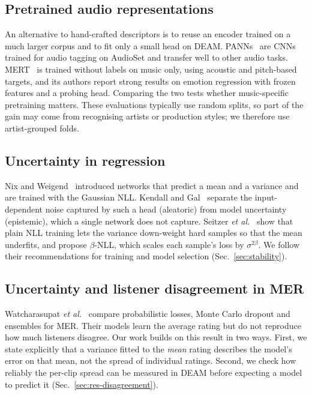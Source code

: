 \documentclass[conference]{IEEEtran}
\begin{document}
\subsection{Pretrained audio representations}
An alternative to hand-crafted descriptors is to reuse an encoder trained on a
much larger corpus and to fit only a small head on DEAM. PANNs~\cite{kong2020}
are CNNs trained for audio tagging on AudioSet and transfer well to other
audio tasks. MERT~\cite{li2024mert} is trained without labels on music only,
using acoustic and pitch-based targets, and its authors report strong results
on emotion regression with frozen features and a probing head. Comparing the
two tests whether music-specific pretraining matters. These evaluations
typically use random splits, so part of the gain may come from recognising
artists or production styles; we therefore use artist-grouped folds.

\subsection{Uncertainty in regression}
Nix and Weigend~\cite{nix1994} introduced networks that predict a mean and a
variance and are trained with the Gaussian NLL. Kendall and
Gal~\cite{kendall2017} separate the input-dependent noise captured by such a
head (aleatoric) from model uncertainty (epistemic), which a single network
does not capture. Seitzer \emph{et al.}~\cite{seitzer2022} show that plain NLL
training lets the variance down-weight hard samples so that the mean
underfits, and propose $\beta$-NLL, which scales each sample's loss by
$\sigma^{2\beta}$. We follow their recommendations for training and model
selection (Sec.~\ref{sec:stability}).

\subsection{Uncertainty and listener disagreement in MER}
Watcharasupat \emph{et al.}~\cite{watcharasupat2025} compare probabilistic
losses, Monte Carlo dropout and ensembles for MER. Their models learn the
average rating but do not reproduce how much listeners disagree. Our work
builds on this result in two ways. First, we state explicitly that a variance
fitted to the \emph{mean} rating describes the model's error on that mean,
not the spread of individual ratings. Second, we check how reliably the
per-clip spread can be measured in DEAM before expecting a model to predict
it (Sec.~\ref{sec:res-disagreement}).
\end{document}

